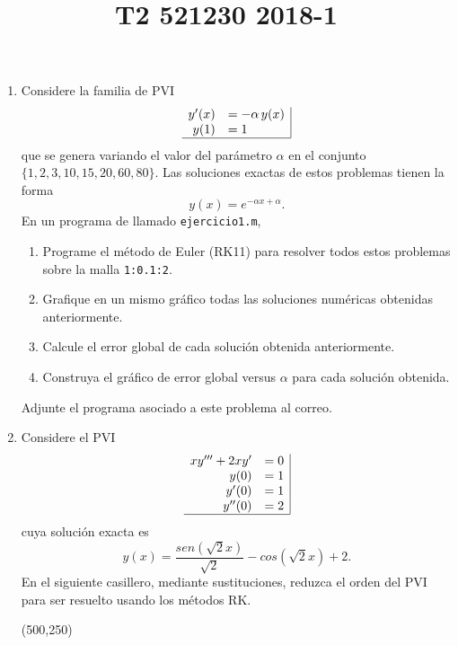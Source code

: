 \documentclass[legalpaper,11pt]{article}
\title{T2 521230 2018-1}
\begin{document}
\begin{enumerate}
\item
Considere la familia de PVI
$$
\begin{array}{rl|}
y'(x)	&=-\alpha\, y(x) \\
y(1)	&=1 \\
\hline
\end{array}
$$
que se genera variando el valor del par\'ametro $\alpha$ en el conjunto $\{1,2,3,10,15,20,60,80\}$. Las soluciones exactas de estos problemas tienen la forma
$$
y(x)=e^{-\alpha x+ \alpha}.
$$
En un programa de \matlab llamado \texttt{ejercicio1.m},
\begin{enumerate}
    \item {} Programe el m\'etodo de Euler (RK11) para resolver todos estos problemas sobre la malla \texttt{1:0.1:2}.
    \item {} Grafique en un mismo gr\'afico todas las soluciones num\'ericas obtenidas anteriormente.
    \item {} Calcule el error global de cada soluci\'on obtenida anteriormente.
    \item {} Construya el gr\'afico de error global versus $\alpha$ para cada soluci\'on obtenida.
\end{enumerate}
Adjunte el programa asociado a este problema al correo.
\vfill

\newpage
{}	%
\item
 Considere el PVI
$$
\begin{array}{rl|}
xy'''+2xy'	&=0 \\
y(0)	&=1\\
y'(0)	&=1\\
y''(0)	&=2\\
\hline
\end{array}
$$
cuya soluci\'on exacta es
$$
y(x) = \frac{sen(\sqrt{2} x)}{\sqrt{2}} - cos(\sqrt{2} x) + 2.
$$
En el siguiente casillero, mediante sustituciones, reduzca el orden del PVI para ser resuelto usando los m\'etodos RK.

\hspace{-10mm}
\framebox(500,250){}


\end{enumerate}
\end{document}
